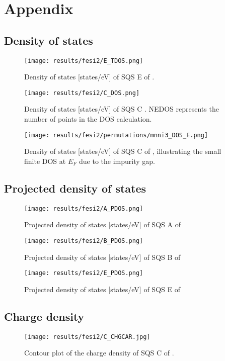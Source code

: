 \chapter{Appendix}
\label{appendix:equi}

\section{Density of states}

\begin{figure}[H]
	\centering
	\texttt{[image: results/fesi2/E\_TDOS.png]}
	\caption{Density of states [states/eV] of SQS E of .}
\end{figure}

\begin{figure}[H]
	\centering
	\texttt{[image: results/fesi2/C\_DOS.png]}
	\caption{Density of states [states/eV] of SQS C . NEDOS represents the number of points in the DOS calculation.}
\end{figure}

\begin{figure}[H]
\texttt{[image: results/fesi2/permutations/mnni3\_DOS\_E.png]}
\caption{Density of states [states/eV] of SQS C of , illustrating the small finite DOS at $E_F$ due to the impurity gap.}
\end{figure}

\section{Projected density of states}

\begin{figure}[H]
\texttt{[image: results/fesi2/A\_PDOS.png]}
\caption{Projected density of states [states/eV] of SQS A of }
\end{figure}

\begin{figure}[H]
\texttt{[image: results/fesi2/B\_PDOS.png]}
\caption{Projected density of states [states/eV] of SQS B of }
\end{figure}

\begin{figure}[H]
\texttt{[image: results/fesi2/E\_PDOS.png]}
\caption{Projected density of states [states/eV] of SQS E of }
\end{figure}

\section{Charge density}

\begin{figure}[H]
\texttt{[image: results/fesi2/C\_CHGCAR.jpg]}
\caption{Contour plot of the charge density of SQS C of .}
\end{figure}

